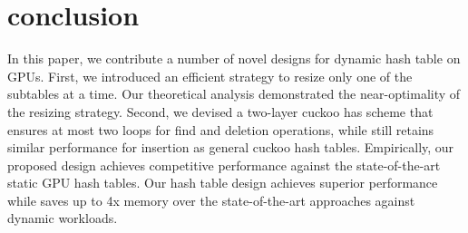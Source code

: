 \section{conclusion}\label{sec:con}
In this paper, we contribute a number of novel designs for dynamic hash table on GPUs. 
First, we introduced an efficient strategy to resize only one of the subtables at a time. Our theoretical analysis demonstrated the near-optimality of the resizing strategy. Second, we devised a two-layer cuckoo has scheme that ensures at most two loops for find and deletion operations, while still retains similar performance for insertion as general cuckoo hash tables. 
Empirically, our proposed design achieves competitive performance against the state-of-the-art static GPU hash tables. Our hash table design achieves superior performance while saves up to 4x memory over the state-of-the-art approaches against dynamic workloads.

 